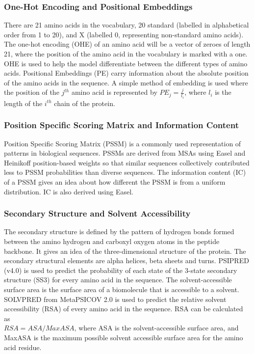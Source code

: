 \documentclass[journal=jacsat,manuscript=article]{achemso}
\begin{document}
\subsubsection{One-Hot Encoding and Positional Embeddings}
\quad There are 21 amino acids in the vocabulary, 20 standard (labelled in alphabetical order from 1 to 20), and X (labelled 0, representing non-standard amino acids). The one-hot encoding (OHE) of an amino acid will be a vector of zeroes of length 21, where the position of the amino acid in the vocabulary is marked with a one. OHE is used to help the model differentiate between the different types of amino acids. Positional Embeddings (PE) carry information about the absolute position of the amino acids in the sequence. A simple method of embedding is used where the position of the $j^{th}$ amino acid is represented by ${PE}_{j} = \frac{j}{l_i}$, where $l_i$ is the length of the $i^{th}$ chain of the protein.

\subsubsection{Position Specific Scoring Matrix and Information Content}
\quad Position Specific Scoring Matrix (PSSM) is a commonly used representation of patterns in biological sequences. PSSMs are derived from MSAs using Easel \cite{potter2018hmmer} and Heinikoff position-based weights so that similar sequences collectively contributed less to PSSM probabilities than diverse sequences. The information content (IC) of a PSSM gives an idea about how different the PSSM is from a uniform distribution. IC is also derived using Easel.

\subsubsection{Secondary Structure and Solvent Accessibility}
\quad The secondary structure is defined by the pattern of hydrogen bonds formed between the amino hydrogen and carboxyl oxygen atoms in the peptide backbone. It gives an idea of the three-dimensional structure of the protein. The secondary structural elements are alpha helices, beta sheets and turns. PSIPRED (v4.0) \cite{jones1999protein} is used to predict the probability of each state of the 3-state secondary structure (SS3) for every amino acid in the sequence. The solvent-accessible surface area is the surface area of a biomolecule that is accessible to a solvent. SOLVPRED from MetaPSICOV 2.0\cite{jones2015metapsicov} is used to predict the relative solvent accessibility (RSA) of every amino acid in the sequence. RSA can be calculated as \\ ${RSA} = {ASA} / {MaxASA}$, where ASA is the solvent-accessible surface area, and MaxASA is the maximum possible solvent accessible surface area for the amino acid residue.
\end{document}
